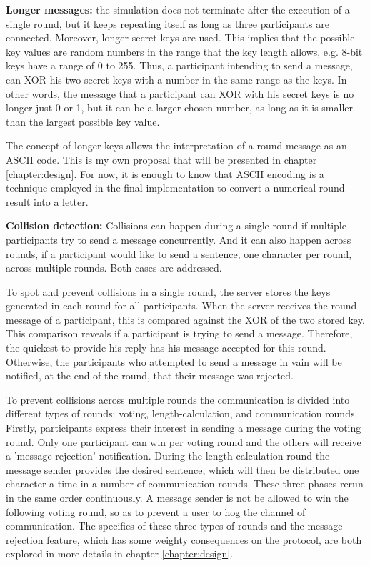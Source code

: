 \textbf{Longer messages:} the simulation does not terminate after the execution of a single round, but it keeps repeating itself as long as three participants are connected. Moreover, longer secret keys are used. This implies that the possible key values are random numbers in the range that the key length allows, e.g. 8-bit keys have a range of 0 to 255. Thus, a participant intending to send a message, can XOR his two secret keys with a number in the same range as the keys. In other words, the message that a participant can XOR with his secret keys is no longer just 0 or 1, but it can be a larger chosen number, as long as it is smaller than the largest possible key value. 

The concept of longer keys allows the interpretation of a round message as an ASCII code. This is my own proposal that will be presented in chapter \ref{chapter:design}. For now, it is enough to know that ASCII encoding is a technique employed in the final implementation to convert a numerical round result into a letter. \newline

\textbf{Collision detection:} Collisions can happen during a single round if multiple participants try to send a message concurrently. And it can also happen across rounds, if a participant would like to send a sentence, one character per round, across multiple rounds. Both cases are addressed.

To spot and prevent collisions in a single round, the server stores the keys generated in each round for all participants. When the server receives the round message of a participant, this is compared against the XOR of the two stored key. This comparison reveals if a participant is trying to send a message. Therefore, the quickest to provide his reply has his message accepted for this round. Otherwise, the participants who attempted to send a message in vain will be notified, at the end of the round, that their message was rejected. 

To prevent collisions across multiple rounds the communication is divided into different types of rounds: voting, length-calculation, and communication rounds. Firstly, participants express their interest in sending a message during the voting round. Only one participant can win per voting round and the others will receive a 'message rejection' notification. During the length-calculation round the message sender provides the desired sentence, which will then be distributed one character a time in a number of communication rounds. These three phases rerun in the same order continuously. A message sender is not be allowed to win the following voting round, so as to prevent a user to hog the channel of communication. The specifics of these three types of rounds and the message rejection feature, which has some weighty consequences on the protocol, are both explored in more details in chapter \ref{chapter:design}.


